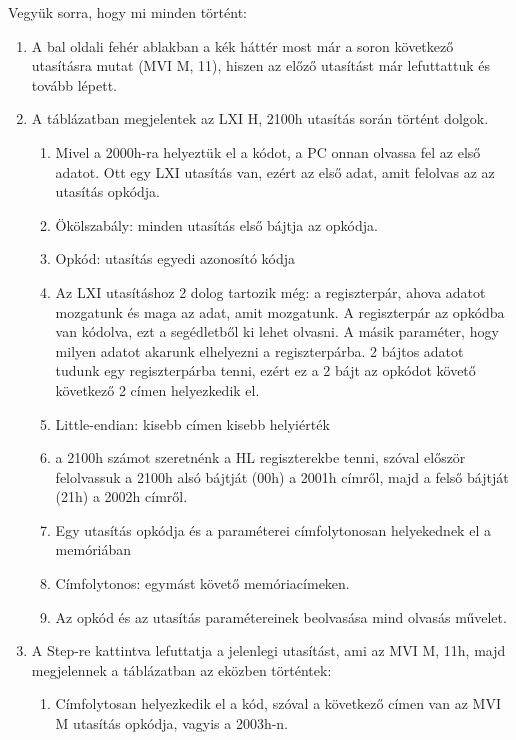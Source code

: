 \documentclass{article}
\begin{document}
Vegyük sorra, hogy mi minden történt:
\begin{enumerate}
	\item A bal oldali fehér ablakban a kék háttér most már a soron következő utasításra mutat (MVI   M, 11), hiszen az előző utasítást már lefuttattuk és tovább lépett.
	\item A táblázatban megjelentek az LXI H, 2100h utasítás során történt dolgok.
	\begin{enumerate}
		\item Mivel a 2000h-ra helyeztük el a kódot, a PC onnan olvassa fel az első adatot. Ott egy LXI utasítás van, ezért az első adat, amit felolvas az az utasítás opkódja.
		\item \colorbox{orange!30}{Ökölszabály: minden utasítás első bájtja az opkódja.}
		\item \colorbox{orange!30}{Opkód: utasítás egyedi azonosító kódja}
		\item Az LXI utasításhoz 2 dolog tartozik még: a regiszterpár, ahova adatot mozgatunk és maga az adat, amit mozgatunk. A regiszterpár az opkódba van kódolva, ezt a segédletből ki lehet olvasni. A másik paraméter, hogy milyen adatot akarunk elhelyezni a regiszterpárba. 2 bájtos adatot tudunk egy regiszterpárba tenni, ezért ez a 2 bájt az opkódot követő következő 2 címen helyezkedik el.
		\item \colorbox{orange!30}{Little-endian: kisebb címen kisebb helyiérték}
		\item a 2100h számot szeretnénk a HL regiszterekbe tenni, szóval először felolvassuk a 2100h alsó bájtját (00h) a 2001h címről, majd a felső bájtját (21h) a 2002h címről.
		\item \colorbox{orange!30}{Egy utasítás opkódja és a paraméterei címfolytonosan helyekednek el a memóriában}
		\item \colorbox{orange!30}{Címfolytonos: egymást követő memóriacímeken.}
		\item \colorbox{orange!30}{Az opkód és az utasítás paramétereinek beolvasása mind olvasás művelet.}
	\end{enumerate}
	\item A Step-re kattintva lefuttatja a jelenlegi utasítást, ami az MVI M, 11h, majd megjelennek a táblázatban az eközben történtek:
	\begin{enumerate}
		\item Címfolytosan helyezkedik el a kód, szóval a következő címen van az MVI M utasítás opkódja, vagyis a 2003h-n.

\end{enumerate}
\end{enumerate}
\end{document}
